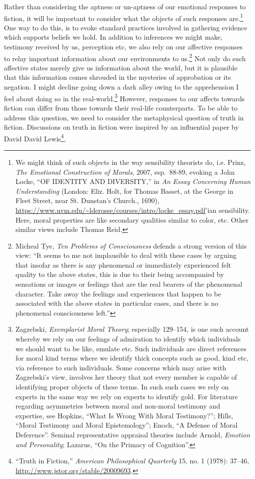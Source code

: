 \documentclass[phdthesis,12pt,final]{wuthesis}
\theoremstyle{definition}
\theoremstyle{definition}
\theoremstyle{definition}
\theoremstyle{definition}
\theoremstyle{remark}
\begin{document}
Rather than considering the aptness or un-aptness of our emotional responses to fiction, it will be important to consider what the objects of such responses are.\footnote{We might think of such objects in the way sensibility theorists do, i.e. Prinz, \emph{The {Emotional Construction} of {Morals}}, 2007, esp.~88-89, evoking a John Locke, {``{OF IDENTITY AND DIVERSITY},''} in \emph{An {Essay Concerning Human Understanding}} (London: Eliz. Holt, for Thomas Basset, at the George in Fleet Street, near St. Dunstan's Church., 1690), \url{https://www.uvm.edu/~lderosse/courses/intro/locke_essay.pdf}'ian sensibility. Here, moral properties are like secondary qualities similar to color, etc. Other similar views include Thomas Reid.} One way to do this, is to evoke standard practices involved in gathering evidence which supports beliefs we hold. In addition to inferences we might make, testimony received by us, perception etc, we also rely on our affective responses to relay important information about our environments to us.\footnote{Micheal Tye, \emph{Ten {Problems} of {Consciousness} } defends a strong version of this view: ``It seems to me not implausible to deal with these cases by arguing that insofar as there is any phenomenal or immediately experienced felt quality to the above states, this is due to their being accompanied by sensations or images or feelings that are the real bearers of the phenomenal character. Take away the feelings and experiences that happen to be associated with the above states in particular cases, and there is no phenomenal consciousness left.''} Not only do such affective states merely give us information about the world, but it is plausible that this information comes shrouded in the mysteries of approbation or its negation. I might decline going down a dark alley owing to the apprehension I feel about doing so in the real-world.\footnote{Zagzebski, \emph{Exemplarist {Moral Theory}}; especially 129--154, is one such account whereby we rely on our feelings of admiration to identify which individuals we should want to be like, emulate etc. Such individuals are direct references for moral kind terms where we identify thick concepts such as good, kind etc, via reference to such individuals. Some concerns which may arise with Zagzebski's view, involves her theory that not every member is capable of identifying proper objects of these terms. In such such cases we rely on experts in the same way we rely on experts to identify gold. For literature regarding asymmetries between moral and non-moral testimony and expertise, see Hopkins, {``What {Is Wrong With Moral Testimony}?''}; Hills, {``Moral Testimony and Moral Epistemology''}; Enoch, {``A {Defense} of {Moral Deference}''}. Seminal representative appraisal theories include Arnold, \emph{Emotion and {Personality}}; Lazarus, {``On the {Primacy} of {Cognition}''}.} However, responses to our affects towards fiction can differ from those towards their real-life counterparts. To be able to address this question, we need to consider the metaphysical question of truth in fiction. Discussions on truth in fiction were inspired by an influential paper by David David Lewis\footnote{{``Truth in {Fiction},''} \emph{American Philosophical Quarterly} 15, no. 1 (1978): 37--46, \url{http://www.jstor.org/stable/20009693}.}, 
\end{document}
